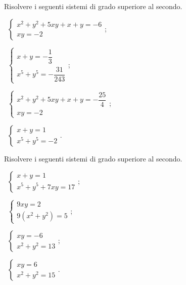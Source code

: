 \begin{esercizio}[\Ast]
\label{ese:6.44}
Risolvere i seguenti sistemi di grado superiore al secondo.
\begin{multicols}{2}
 \begin{enumeratea}
 \item~$\left\{\begin{array}{l}x^2+y^2+5xy+x+y=-6\\xy=-2 \end{array}\right.$;
 \item~$\left\{\begin{array}{l}{x+y=-\dfrac 1 3}\\{x^5+y^5=-\dfrac{31}{243}}\end{array}\right.$;
 \item~$\left\{\begin{array}{l}x^2+y^2+5xy+x+y=-\dfrac{25} 4\\xy=-2 \end{array}\right.$;
 \item~$\left\{\begin{array}{l}{x+y=1}\\{x^5+y^5=-2}\end{array}\right.$.
 \end{enumeratea}
 \end{multicols}
\end{esercizio}

\begin{esercizio}[\Ast]
 \label{ese:6.45}
Risolvere i seguenti sistemi di grado superiore al secondo.
\begin{multicols}{2}
 \begin{enumeratea}
 \item~$\left\{\begin{array}{l}{x+y=1}\\{x^5+y^5+7{xy}=17}\end{array}\right.$;
 \item~$\left\{\begin{array}{l}9xy=2\\9\left(x^{2}+y^{2}\right)=5\end{array}\right.$;
 \item~$\left\{\begin{array}{l}xy=-6\\x^{2}+y^{2}=13\end{array}\right.$;
 \item~$\left\{\begin{array}{l}xy=6\\x^{2}+y^{2}=15\end{array}\right.$.
 \end{enumeratea}
 \end{multicols}
\end{esercizio}

